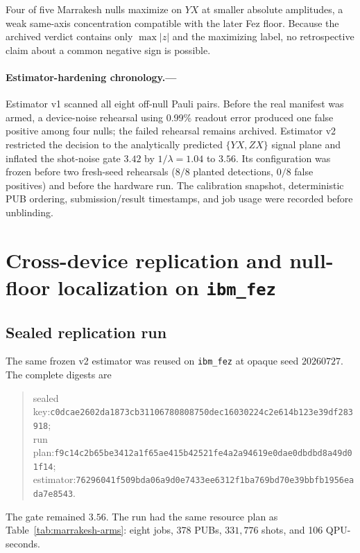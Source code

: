 \documentclass[aps,prl,onecolumn,superscriptaddress,nofootinbib]{revtex4-2}
\newcommand{\hashfour}[4]{\texttt{#1}\allowbreak\texttt{#2}\allowbreak\texttt{#3}\allowbreak\texttt{#4}}
\begin{document}
Four of five Marrakesh nulls maximize on $YX$ at smaller absolute amplitudes, a weak same-axis concentration compatible with the later Fez floor.  Because the archived verdict contains only $\max|z|$ and the maximizing label, no retrospective claim about a common negative sign is possible.

\paragraph{Estimator-hardening chronology.---}
Estimator v1 scanned all eight off-null Pauli pairs.  Before the real manifest was armed, a device-noise rehearsal using 0.99\% readout error produced one false positive among four nulls; the failed rehearsal remains archived.  Estimator v2 restricted the decision to the analytically predicted $\{YX,ZX\}$ signal plane and inflated the shot-noise gate $3.42$ by $1/\lambda=1.04$ to $3.56$.  Its configuration was frozen before two fresh-seed rehearsals ($8/8$ planted detections, $0/8$ false positives) and before the hardware run.  The calibration snapshot, deterministic PUB ordering, submission/result timestamps, and job usage were recorded before unblinding.

\section{Cross-device replication and null-floor localization on \texttt{ibm\_fez}}
\label{sec:fez}

\subsection{Sealed replication run}

The same frozen v2 estimator was reused on \texttt{ibm\_fez} at opaque seed $20260727$.  The complete digests are
\begin{quote}\small\raggedright
sealed key:\quad \hashfour{c0dcae2602da1873}{cb31106780808750}{dec16030224c2e61}{4b123e39df283918};\\
run plan:\quad \hashfour{f9c14c2b65be3412}{a1f65ae415b42521}{fe4a2a94619e0dae}{0dbdbd8a49d01f14};\\
estimator:\quad \hashfour{76296041f509bda0}{6a9d0e7433ee6312}{f1ba769bd70e39bb}{fb1956eada7e8543}.
\end{quote}
The gate remained $3.56$.  The run had the same resource plan as Table~\ref{tab:marrakesh-arms}: eight jobs, 378 PUBs, $331{,}776$ shots, and 106 QPU-seconds.
\end{document}
